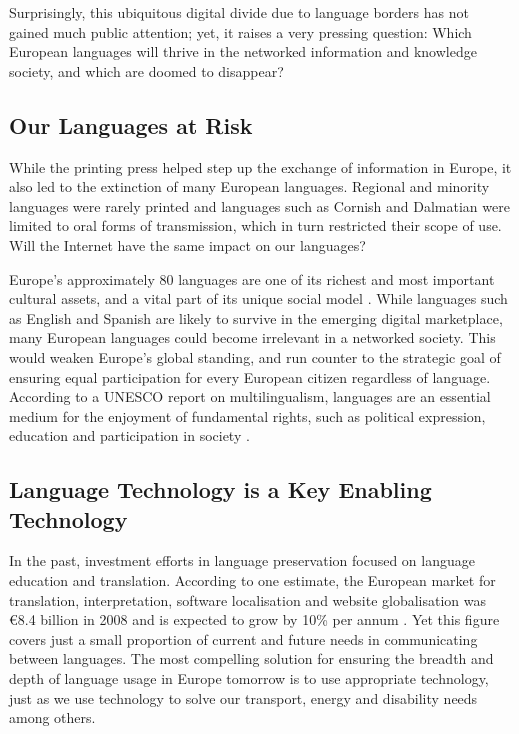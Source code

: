 \begin{multicols}{2}
    Surprisingly, this ubiquitous digital divide due to language borders has not gained much public attention; yet, it raises a very pressing question: Which European languages will thrive in the networked information and knowledge society, and which are doomed to disappear?

\subsection{Our Languages at Risk}

    While the printing press helped step up the exchange of information in Europe, it also led to the extinction of many European languages. Regional and minority languages were rarely printed and languages such as Cornish and Dalmatian were limited to oral forms of transmission, which in turn restricted their scope of use. Will the Internet have the same impact on our languages?


    Europe’s approximately 80 languages are one of its richest and most important cultural assets, and a vital part of its unique social model \cite{BAS-Nota2}. While languages such as English and Spanish are likely to survive in the emerging digital marketplace, many European languages could become irrelevant in a networked society. This would weaken Europe’s global standing, and run counter to the strategic goal of ensuring equal participation for every European citizen regardless of language. According to a UNESCO report on multilingualism, languages are an essential medium for the enjoyment of fundamental rights, such as political expression, education and participation in society \cite{BAS-Nota3}.

\subsection{Language Technology is a Key Enabling Technology}
    In the past, investment efforts in language preservation focused on language education and translation. According to one estimate, the European market for translation, interpretation, software localisation and website globalisation was €8.4 billion in 2008 and is expected to grow by 10\% per annum \cite{BAS-Nota4}. Yet this figure covers just a small proportion of current and future needs in communicating between languages. The most compelling solution for ensuring the breadth and depth of language usage in Europe tomorrow is to use appropriate technology, just as we use technology to solve our transport, energy and disability needs among others.


\end{multicols}
